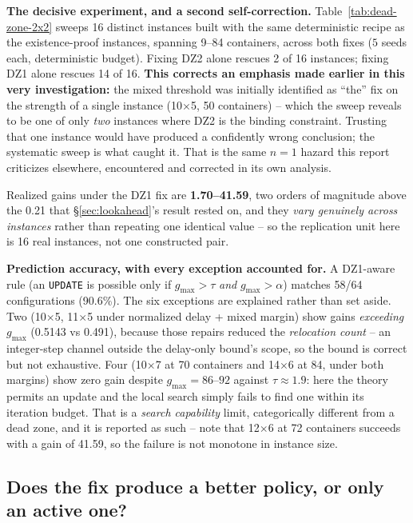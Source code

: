 \documentclass[11pt]{article}
\begin{document}
\textbf{The decisive experiment, and a second self-correction.}
Table~\ref{tab:dead-zone-2x2} sweeps 16 distinct instances built with the
same deterministic recipe as the existence-proof instances, spanning 9--84
containers, across both fixes ($5$ seeds each, deterministic budget). Fixing
DZ2 alone rescues 2 of 16 instances; fixing DZ1 alone rescues 14 of 16.
\textbf{This corrects an emphasis made earlier in this very investigation:}
the mixed threshold was initially identified as ``the'' fix on the strength
of a single instance (10$\times$5, 50 containers) -- which the sweep reveals
to be one of only \emph{two} instances where DZ2 is the binding constraint.
Trusting that one instance would have produced a confidently wrong
conclusion; the systematic sweep is what caught it. That is the same
$n{=}1$ hazard this report criticizes elsewhere, encountered and corrected
in its own analysis.

Realized gains under the DZ1 fix are \textbf{1.70--41.59}, two orders of
magnitude above the 0.21 that \S\ref{sec:lookahead}'s result rested on, and
they \emph{vary genuinely across instances} rather than repeating one
identical value -- so the replication unit here is 16 real instances, not
one constructed pair.

\textbf{Prediction accuracy, with every exception accounted for.} A
DZ1-aware rule (an \texttt{UPDATE} is possible only if $g_{\max} > \tau$
\emph{and} $g_{\max} > \alpha$) matches 58/64 configurations (90.6\%). The
six exceptions are explained rather than set aside. Two (10$\times$5,
11$\times$5 under normalized delay + mixed margin) show gains
\emph{exceeding} $g_{\max}$ (0.5143 vs 0.491), because those repairs reduced
the \emph{relocation count} -- an integer-step channel outside the
delay-only bound's scope, so the bound is correct but not exhaustive. Four
(10$\times$7 at 70 containers and 14$\times$6 at 84, under both margins)
show zero gain despite $g_{\max} = 86$--$92$ against $\tau \approx 1.9$:
here the theory permits an update and the local search simply fails to find
one within its iteration budget. That is a \emph{search capability} limit,
categorically different from a dead zone, and it is reported as such --
note that 12$\times$6 at 72 containers succeeds with a gain of 41.59, so the
failure is not monotone in instance size.

\subsection{Does the fix produce a better policy, or only an active one?}
\label{sec:dead-zone-baselines}
\end{document}
